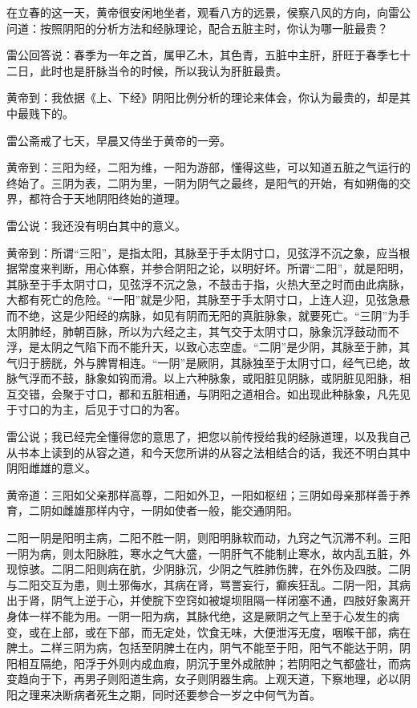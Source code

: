 \documentclass[12pt,UTF8]{ctexbook}
\begin{document}
在立春的这一天，黄帝很安闲地坐者，观看八方的远景，侯察八风的方向，向雷公问道：按照阴阳的分析方法和经脉理论，配合五脏主时，你认为哪一脏最贵？

雷公回答说：春季为一年之首，属甲乙木，其色青，五脏中主肝，肝旺于春季七十二日，此时也是肝脉当令的时候，所以我认为肝脏最贵。

黄帝到：我依据《上、下经》阴阳比例分析的理论来体会，你认为最贵的，却是其中最贱下的。

雷公斋戒了七天，早晨又侍坐于黄帝的一旁。

黄帝到：三阳为经，二阳为维，一阳为游部，懂得这些，可以知道五脏之气运行的终始了。三阴为表，二阴为里，一阴为阴气之最终，是阳气的开始，有如朔侮的交界，都符合于天地阴阳终始的道理。

雷公说：我还没有明白其中的意义。

黄帝到：所谓“三阳”，是指太阳，其脉至于手太阴寸口，见弦浮不沉之象，应当根据常度来判断，用心体察，并参合阴阳之论，以明好坏。所谓“二阳”，就是阳明，其脉至于手太阴寸口，见弦浮不沉之急，不鼓击于指，火热大至之时而由此病脉，大都有死亡的危险。“一阳”就是少阳，其脉至于手太阴寸口，上连人迎，见弦急悬而不绝，这是少阳经的病脉，如见有阴而无阳的真脏脉象，就要死亡。“三阴”为手太阴肺经，肺朝百脉，所以为六经之主，其气交于太阴寸口，脉象沉浮鼓动而不浮，是太阴之气陷下而不能升天，以致心志空虚。“二阴”是少阴，其脉至于肺，其气归于膀胱，外与脾胃相连。“一阴”是厥阴，其脉独至于太阴寸口，经气已绝，故脉气浮而不鼓，脉象如钩而滑。以上六种脉象，或阳脏见阴脉，或阴脏见阳脉，相互交错，会聚于寸口，都和五脏相通，与阴阳之道相合。如出现此种脉象，凡先见于寸口的为主，后见于寸口的为客。

雷公说；我已经完全懂得您的意思了，把您以前传授给我的经脉道理，以及我自己从书本上读到的从容之道，和今天您所讲的从容之法相结合的话，我还不明白其中阴阳雌雄的意义。

黄帝道：三阳如父亲那样高尊，二阳如外卫，一阳如枢纽；三阴如母亲那样善于养育，二阴如雌雄那样内守，一阴如使者一般，能交通阴阳。

二阳一阴是阳明主病，二阳不胜一阴，则阳明脉软而动，九窍之气沉滞不利。三阳一阴为病，则太阳脉胜，寒水之气大盛，一阴肝气不能制止寒水，故内乱五脏，外现惊骇。二阴二阳则病在肮，少阴脉沉，少阴之气胜肺伤脾，在外伤及四肢。二阴与二阳交互为患，则土邪侮水，其病在肾，骂詈妄行，癫疾狂乱。二阴一阳，其病出于肾，阴气上逆于心，并使脘下空窍如被堤坝阻隔一样闭塞不通，四肢好象离开身体一样不能为用。一阴一阳为病，其脉代绝，这是厥阴之气上至于心发生的病变，或在上部，或在下部，而无定处，饮食无味，大便泄泻无度，咽喉干部，病在脾土。二样三阴为病，包括至阴脾土在内，阴气不能至于阳，阳气不能达于阴，阴阳相互隔绝，阳浮于外则内成血瘕，阴沉于里外成脓肿；若阴阳之气都盛壮，而病变趋向于下，再男子则阳道生病，女子则阴器生病。上观天道，下察地理，必以阴阳之理来决断病者死生之期，同时还要参合一岁之中何气为首。
\end{document}
